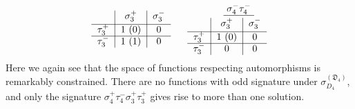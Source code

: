 \documentclass[11pt]{article}
\begin{document}
\begin{equation}
\begin{tabular}{ c | c | c |}
 & $\sigma_3^+$ & \multicolumn{1}{c}{$\sigma_3^-$} \\[-1em]
 & & \multicolumn{1}{c}{} \\
\cline{1-3} $\tau_3^+$ & 1 (0) & \multicolumn{1}{c}{0} \\
\cline{1-3} $\tau_3^-$ & 1 (1) & \multicolumn{1}{c}{0} 
\end{tabular}
\hspace{.6cm}
\begin{tabular}{ c | c | c |}
\multicolumn{1}{c}{} &\multicolumn{2}{c}{$\underline{\ \sigma_4^- \tau_4^- \ }$} \\[-1em]
\multicolumn{1}{c}{} & \multicolumn{1}{c}{} & \multicolumn{1}{c}{}\\
 & $\sigma_3^+$ & \multicolumn{1}{c}{$\sigma_3^-$} \\[-1em]
 & & \multicolumn{1}{c}{} \\
\cline{1-3} $\tau_3^+$ & 1 (0) & \multicolumn{1}{c}{0} \\
\cline{1-3} $\tau_3^-$ & 0 & \multicolumn{1}{c}{0} 
\end{tabular}
\vspace{.2cm}
\end{equation}
Here we again see that the space of functions respecting automorphisms is remarkably constrained. There are no functions with odd signature under $\sigma^{({\mathfrak D}_4)}_{D_4}$, and only the signature $\sigma_4^+\tau_4^-\sigma_3^+\tau_3^+$ gives rise to more than one solution.
\end{document}
